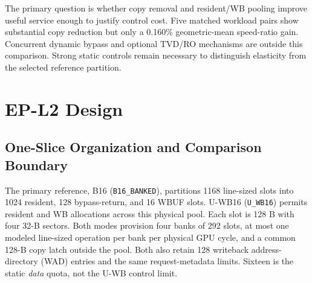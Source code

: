 \documentclass[conference,letterpaper]{IEEEtran}
\newcommand{\base}{B16}
\newcommand{\unif}{U-WB16}
\begin{document}
The primary question is whether copy removal and resident/WB pooling improve useful service enough to justify control cost. Five matched workload pairs show substantial copy reduction but only a 0.160\% geometric-mean speed-ratio gain. Concurrent dynamic bypass and optional TVD/RO mechanisms are outside this comparison. Strong static controls remain necessary to distinguish elasticity from the selected reference partition.

\section{EP-L2 Design}
\subsection{One-Slice Organization and Comparison Boundary}
The primary reference, \base{} (\texttt{B16\_BANKED}), partitions 1168 line-sized slots into 1024 resident, 128 bypass-return, and 16 WBUF slots. \unif{} (\texttt{U\_WB16}) permits resident and WB allocations across this physical pool. Each slot is 128 B with four 32-B sectors. Both modes provision four banks of 292 slots, at most one modeled line-sized operation per bank per physical GPU cycle, and a common 128-B copy latch outside the pool. Both also retain 128 writeback address-directory (WAD) entries and the same request-metadata limits. Sixteen is the static \emph{data} quota, not the U-WB control limit.
\end{document}
